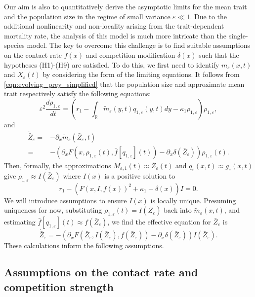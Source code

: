 \documentclass[]{article}
\theoremstyle{remark}
\begin{document}
Our aim is also to quantitatively derive the asymptotic limits for the mean trait and the population size in the regime of small variance $\varepsilon\ll 1$. Due to the additional nonlinearity and non-locality arising from the trait-dependent mortality rate, the analysis of this model is much more intricate than the single-species model. The key to overcome this challenge is to find suitable assumptions on the contact rate $f(x)$ and competition-modification $\delta(x)$ such that the hypotheses (H1)-(H9) are satisfied. To do this, we first need to identify $m_\varepsilon(x,t)$ and $X_\varepsilon(t)$ by considering the form of the limiting equations. It follows from \eqref{eqn:evolving_prey_simplified} that the population size and approximate mean trait respectively satisfy the following equations:
\begin{equation}\label{eqn:IP_population_size}
\varepsilon^{2}\frac{d\rho_{1,\varepsilon}}{dt}=\left(r_1-\int_{\mathbb{R}}\tilde{m}_\varepsilon(y,t)q_{1,\varepsilon}(y,t)dy-\kappa_1\rho_{1,\varepsilon}\right)\rho_{1,\varepsilon},
\end{equation}
and 
\begin{align*}
    \dot{\bar{Z}}_\varepsilon=&-\partial_{x}\tilde{m}_\varepsilon(\bar{Z}_\varepsilon,t)\\
    =&-(\partial_{x}F(x,\rho_{1,\varepsilon}(t),\bar{f}[q_{1,\varepsilon}](t))-\partial_{x}\delta(\bar{Z}_\varepsilon))\rho_{1,\varepsilon}(t).
\end{align*}
Then, formally, the approximations $M_{\varepsilon,1}(t)\approx{}\bar{Z}_{\varepsilon}(t)$ and $q_\varepsilon(x,t)\approx{}g_\varepsilon(x,t)$ give $\rho_{1,\varepsilon}\approx{}I(\bar{Z}_\varepsilon)$ where $I(x)$ is a positive solution to 
\[r_1-(F(x,I,f(x))^2+\kappa_1-\delta(x))I=0.\]
We will introduce assumptions to ensure $I(x)$ is locally unique. Presuming uniqueness for now, substituting $\rho_{1,\varepsilon}(t)=I(\bar{Z}_\varepsilon)$ back into $\tilde{m}_\varepsilon(x,t)$, and estimating $\bar{f}[q_{1,\varepsilon}](t)\approx{}f(\bar{Z}_\varepsilon)$, we find the effective equation for $\bar{Z}_\varepsilon$ is 
\begin{equation}\label{eq:trait_dynamics}
    \dot{\bar{Z}}_\varepsilon=-(\partial_{x}F(\bar{Z}_\varepsilon,I(\bar{Z}_\varepsilon),f(\bar{Z}_\varepsilon))-\partial_{x}\delta(\bar{Z}_\varepsilon))I(\bar{Z}_\varepsilon).
\end{equation}
These calculations inform the following assumptions.
\subsection*{Assumptions on the contact rate and competition strength}
\end{document}
